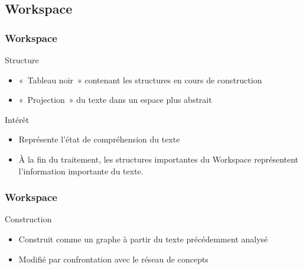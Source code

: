 \documentclass[12pt]{beamer}
\begin{document}
\subsection{Workspace}

\begin{frame}
  \frametitle{Workspace}

  \begin{block}{Structure}
    \begin{itemize}
      \item «~Tableau noir~» contenant les structures en cours de construction
      \item «~Projection~» du texte dans un espace plus abstrait
    \end{itemize}
  \end{block}
  
  \pause
  
  \begin{block}{Intérêt}
    \begin{itemize}
      \item Représente l'état de compréhension du texte
      \item À la fin du traitement, les structures importantes du Workspace représentent l'information importante du texte.
    \end{itemize}
  \end{block}

  
\end{frame}

\begin{frame}
  \frametitle{Workspace}
 
  \begin{block}{Construction}
    \begin{itemize}
      \item Construit comme un graphe à partir du texte précédemment analysé
      \item Modifié par confrontation avec le réseau de concepts
    \end{itemize}
  \end{block}
 
\end{frame}
\end{document}
